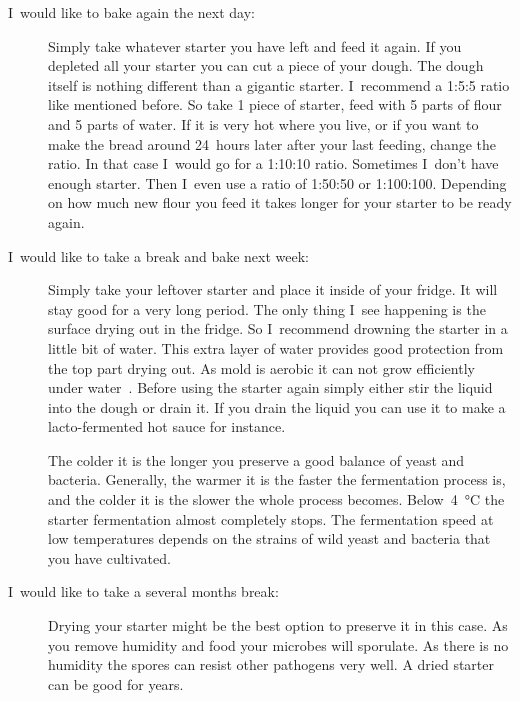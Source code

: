\begin{description}
\item[I~would like to bake again the next day:]
Simply take whatever starter you have left and feed it again. If you depleted
all your starter you can cut a piece of your dough. The dough itself is
nothing different than a gigantic starter. I~recommend a 1:5:5 ratio like
mentioned before. So take 1 piece of starter, feed with 5 parts of flour and 5
parts of water. If it is very hot where you live, or if you want to make the
bread around 24~hours later after your last feeding, change the ratio. In that
case I~would go for a 1:10:10 ratio. Sometimes I~don't have enough starter.
Then I~even use a ratio of 1:50:50 or 1:100:100. Depending on how much new
flour you feed it takes longer for your starter to be ready again.

\item[I~would like to take a break and bake next week:]
Simply take your leftover starter and place it inside of your fridge. It will stay good
for a very long period. The only thing I~see happening is the surface
drying out in the fridge. So I~recommend drowning the starter in a little bit
of water. This extra layer of water provides good protection from the top
part drying out. As mold is aerobic it can not grow efficiently under
water~\cite{mold+anaerobic}. Before using the starter again simply either stir
the liquid into the dough or drain it. If you drain the liquid you can use it
to make a lacto-fermented hot sauce for instance.

The colder it is the longer you preserve a good balance of yeast and
bacteria. Generally, the warmer it is the faster the fermentation process is,
and the colder it is the slower the whole process becomes.
Below~\qty{4}{\degreeCelsius} the starter fermentation almost completely stops. The
fermentation speed at low temperatures depends on the
strains of wild yeast and bacteria
that you have cultivated.

\item[I~would like to take a several months break:]
Drying your starter might be the best option to preserve it in this case. As
you remove humidity and food your microbes will sporulate. As there is no
humidity the spores can resist other pathogens very well. A dried starter can
be good for years.


\end{description}

